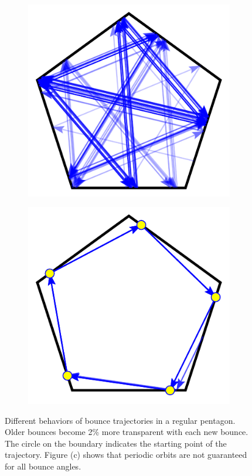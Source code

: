 \documentclass[letterpaper, 10 pt, conference]{ieeeconf}  %
\begin{document}
\begin{figure}[tp]
\begin{subfigure}{0.25\textwidth}
\includegraphics[width=0.8\linewidth]{../figs/pent_165rad.pdf}
\end{subfigure}%
\begin{subfigure}{0.25\textwidth}
\includegraphics[width=0.8\linewidth]{../figs/pent_3rad.pdf}
\end{subfigure}
\caption{Different behaviors of bounce trajectories in a regular pentagon.
Older bounces become 2\% more transparent with each new bounce. The circle on
the boundary indicates the starting point of the trajectory. Figure (c) shows
that periodic orbits are not guaranteed for all bounce angles.}
\end{figure}
\end{document}

